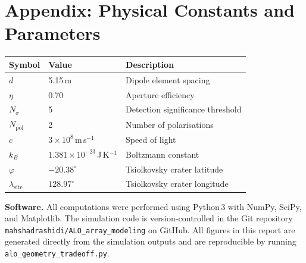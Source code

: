 \documentclass[12pt,a4paper]{article}
\begin{document}
\appendix
\section*{Appendix: Physical Constants and Parameters}

\begin{center}
\begin{tabular}{lll}
  \toprule
  Symbol & Value & Description \\
  \midrule
  $d$        & 5.15\,m                 & Dipole element spacing \\
  $\eta$     & 0.70                    & Aperture efficiency \\
  $N_\sigma$ & 5                       & Detection significance threshold \\
  $N_\mathrm{pol}$ & 2               & Number of polarisations \\
  $c$        & $3\times10^8$\,m\,s$^{-1}$ & Speed of light \\
  $k_B$      & $1.381\times10^{-23}$\,J\,K$^{-1}$ & Boltzmann constant \\
  $\varphi$  & $-20.38^\circ$          & Tsiolkovsky crater latitude \\
  $\lambda_\mathrm{site}$  & $128.97^\circ$ & Tsiolkovsky crater longitude \\
  \bottomrule
\end{tabular}
\end{center}

\vspace{1em}
\noindent\textbf{Software.}
All computations were performed using Python\,3 with NumPy, SciPy, and
Matplotlib.
The simulation code is version-controlled in the Git repository
\texttt{mahshadrashidi/ALO\_array\_modeling} on GitHub.
All figures in this report are generated directly from the simulation outputs
and are reproducible by running \texttt{alo\_geometry\_tradeoff.py}.
\end{document}
